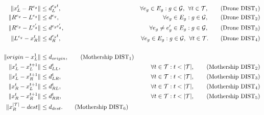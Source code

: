 
\begin{align*}
\|x_L^t- R^{e_g}\| & \leq  d_L^{e_gt},  &\forall e_g\in E_g:g\in \mathcal{G}, \:\:\forall t\in \mathcal T, \tag{Drone DIST$_{1}$} \label{eq:drone-d1-async}\\
\|R^{e_g}- L^{e_g}\| & \leq  d^{e_g},  &\forall e_g\in E_g:g\in \mathcal{G}, \tag{Drone DIST$_{2}$} \label{eq:drone-d2-async}\\
\|R^{e_g}- L^{e'_g}\| & \leq  d^{e_ge'_g}, &\forall e_g\neq e_g'\in E_g:g\in \mathcal{G}, \tag{Drone DIST$_{3}$} \label{eq:drone-d3-async}\\
\|L^{e_g}- x_R^t\| & \leq  d_R^{e_gt}, &\forall e_g\in E_g:g\in \mathcal{G},\:\:\forall t\in \mathcal T. \tag{Drone DIST$_{4}$} \label{eq:drone-d4-async}\\\\
\|origin - x_L^1\| & \leq d_{origin}, \tag{Mothership DIST$_1$}\label{eq:mothership-d1-async}\\
\|x_L^t - x_L^{t+1}\| & \leq d_{LL}^{t}, &\forall t\in\mathcal T:t<|\mathcal T|, \tag{Mothership DIST$_{2}$}\label{eq:mothership-d2-async}\\
\|x_L^t - x_R^{t+1}\| & \leq d_{LR}^{t}, &\forall t\in\mathcal T:t<|\mathcal T|, \tag{Mothership DIST$_{3}$}\label{eq:mothership-d3-async}\\
\|x_R^t - x_L^{t+1}\| & \leq d_{RL}^{t}, &\forall t\in\mathcal T:t<|\mathcal T|, \tag{Mothership DIST$_{4}$}\label{eq:mothership-d4-async}\\
\|x_R^t - x_R^{t+1}\| & \leq d_{RR}^{t}, &\forall t\in\mathcal T:t<|\mathcal T|, \tag{Mothership DIST$_{5}$}\label{eq:mothership-d5-async}\\
\|x_R^{|\mathcal T|} - dest\| & \leq d_{dest}. \tag{Mothership DIST$_6$}\label{eq:mothership-d6-async}
\end{align*}

